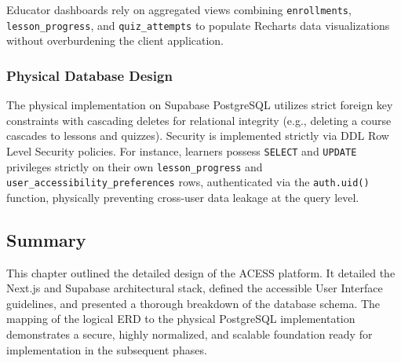 \documentclass[12pt,a4paper]{report}
\begin{document}
Educator dashboards rely on aggregated views combining \texttt{enrollments}, \texttt{lesson\_progress}, and \texttt{quiz\_attempts} to populate Recharts data visualizations without overburdening the client application.

\subsubsection{Physical Database Design}
The physical implementation on Supabase PostgreSQL utilizes strict foreign key constraints with cascading deletes for relational integrity (e.g., deleting a course cascades to lessons and quizzes). Security is implemented strictly via DDL Row Level Security policies. For instance, learners possess \texttt{SELECT} and \texttt{UPDATE} privileges strictly on their own \texttt{lesson\_progress} and \texttt{user\_accessibility\_preferences} rows, authenticated via the \texttt{auth.uid()} function, physically preventing cross-user data leakage at the query level.

\subsection{Summary}
This chapter outlined the detailed design of the ACESS platform. It detailed the Next.js and Supabase architectural stack, defined the accessible User Interface guidelines, and presented a thorough breakdown of the database schema. The mapping of the logical ERD to the physical PostgreSQL implementation demonstrates a secure, highly normalized, and scalable foundation ready for implementation in the subsequent phases.

\vfill \null
\end{document}
